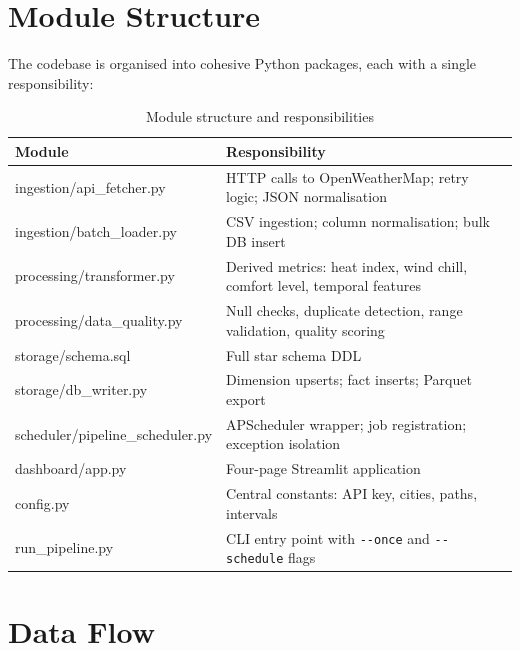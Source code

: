 \documentclass[12pt,a4paper]{report}
\begin{document}
\section{Module Structure}

The codebase is organised into cohesive Python packages, each with a single responsibility:

\begin{table}[H]
  \centering
  \caption{Module structure and responsibilities}
  \label{tab:modules}
  \begin{tabular}{>{\ttfamily}l p{8cm}}
    \toprule
    \textbf{Module} & \textbf{Responsibility} \\
    \midrule
    ingestion/api\_fetcher.py    & HTTP calls to OpenWeatherMap; retry logic; JSON normalisation \\
    ingestion/batch\_loader.py   & CSV ingestion; column normalisation; bulk DB insert \\
    processing/transformer.py   & Derived metrics: heat index, wind chill, comfort level, temporal features \\
    processing/data\_quality.py  & Null checks, duplicate detection, range validation, quality scoring \\
    storage/schema.sql          & Full star schema DDL \\
    storage/db\_writer.py        & Dimension upserts; fact inserts; Parquet export \\
    scheduler/pipeline\_scheduler.py & APScheduler wrapper; job registration; exception isolation \\
    dashboard/app.py            & Four-page Streamlit application \\
    config.py                   & Central constants: API key, cities, paths, intervals \\
    run\_pipeline.py             & CLI entry point with \texttt{-{}-once} and \texttt{-{}-schedule} flags \\
    \bottomrule
  \end{tabular}
\end{table}

\section{Data Flow}
\end{document}
